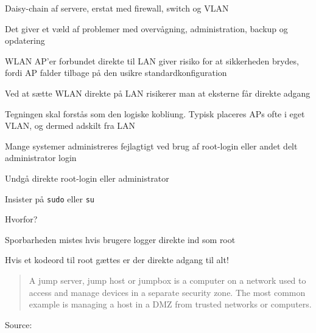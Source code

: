\documentclass[Screen16to9,17pt]{foils}
\begin{document}
\begin{list1}
\item Daisy-chain af servere, erstat med firewall, switch og VLAN
\item Det giver et væld af problemer med overvågning, administration, backup og opdatering
\end{list1}



\begin{list1}
\item WLAN AP'er forbundet direkte til LAN giver risiko for at sikkerheden brydes, fordi AP falder tilbage på den usikre standardkonfiguration
\item Ved at sætte WLAN direkte på LAN risikerer man at eksterne får direkte adgang
\item Tegningen skal forstås som den logiske kobliung. Typisk placeres APs ofte i eget VLAN, og dermed adskilt fra LAN
\end{list1}




\begin{list1}
\item Mange systemer administreres fejlagtigt ved brug af
  root-login eller andet delt administrator login
\item Undgå direkte root-login eller administrator
\item Insister på \verb+sudo+ eller \verb+su+
\item Hvorfor?
\begin{list2}
\item Sporbarheden mistes hvis brugere logger direkte ind som root
\item Hvis et kodeord til root gættes er der direkte adgang til alt!
\end{list2}
\end{list1}




\begin{quote}
A jump server, jump host or jumpbox is a computer on a network used to access and manage devices in a separate security zone. The most common example is managing a host in a DMZ from trusted networks or computers.
\end{quote}
Source: 
\end{document}

